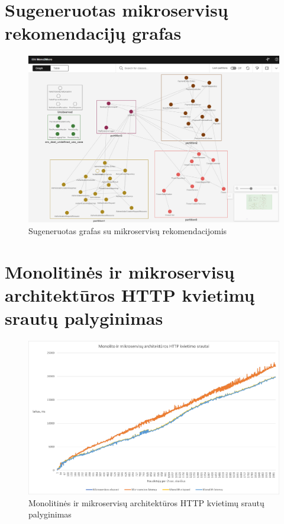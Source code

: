 \documentclass{VUMIFPSbakalaurinis}
\begin{document}

\section{Sugeneruotas mikroservisų rekomendacijų grafas}
\begin{figure}[H]
    \centering
    \includegraphics[scale=0.4]{img/grafas.png}
    \caption{Sugeneruotas grafas su mikroservisų rekomendacijomis}
    \label{img:grafas}
\end{figure}

\section{Monolitinės ir mikroservisų architektūros HTTP kvietimų srautų palyginimas}
\begin{figure}[H]
    \centering
    \includegraphics[scale=0.6]{img/latency.png}
    \caption{Monolitinės ir mikroservisų architektūros HTTP kvietimų srautų palyginimas}
    \label{img:latency}
\end{figure}
\end{document}
